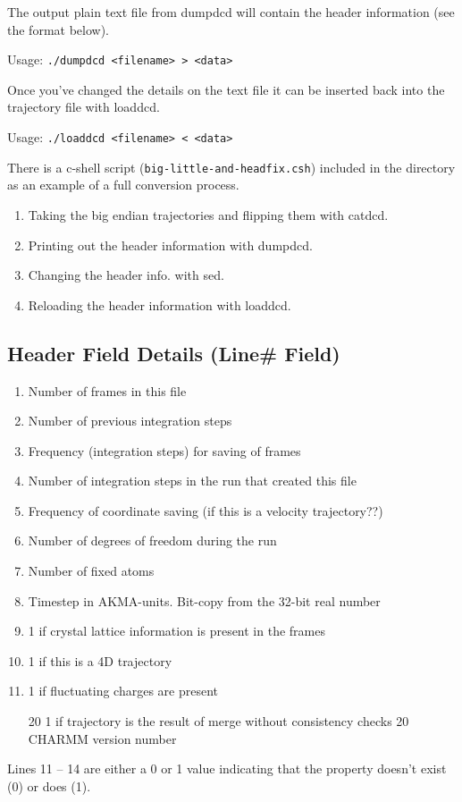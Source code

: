 \documentclass[11pt,a4paper]{article}
\begin{document}
    The output plain text file from dumpdcd will contain the header 
    information (see the format below). 

    Usage: \texttt{./dumpdcd <filename> > <data>}

    Once you've changed the details on the text file it can be inserted 
    back into the trajectory file with loaddcd.

    Usage: \texttt{./loaddcd <filename> < <data>}

    There is a c-shell script (\texttt{big-little-and-headfix.csh}) included in 
    the directory as an example of a full conversion process.
    
    \begin{enumerate}
    \item Taking the big endian trajectories and flipping them with catdcd. 
    \item Printing out the header information with dumpdcd.
    \item Changing the header info. with sed.
    \item Reloading the header information with loaddcd.
    \end{enumerate}

    \subsection*{Header Field Details (Line\# Field)} %
    \label{sub:header_field_details_line_field}
    \begin{enumerate}
    \item Number of frames in this file
    \item Number of previous integration steps
    \item Frequency (integration steps) for saving of frames
    \item Number of integration steps in the run that created this file
    \item Frequency of coordinate saving (if this is a velocity trajectory??)
    \item Number of degrees of freedom during the run
    \item Number of fixed atoms
    \item Timestep in AKMA-units. Bit-copy from the 32-bit real number
    \item 1 if crystal lattice information is present in the frames
    \item 1 if this is a 4D trajectory
    \item 1 if fluctuating charges are present
    \item[20] 1 if trajectory is the result of merge without consistency checks
    20 CHARMM version number
    \end{enumerate}

    Lines 11 -- 14 are either a 0 or 1 value indicating that the property
    doesn't exist (0) or does (1).
\end{document}
